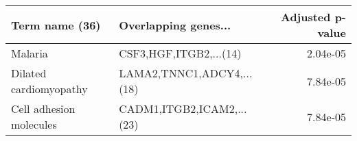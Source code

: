 \begin{tabular}{llr}
\toprule
         Term name (36) &      Overlapping genes... &  Adjusted p-value \\
\midrule
                Malaria &    CSF3,HGF,ITGB2,...(14) &          2.04e-05 \\
 Dilated cardiomyopathy & LAMA2,TNNC1,ADCY4,...(18) &          7.84e-05 \\
Cell adhesion molecules & CADM1,ITGB2,ICAM2,...(23) &          7.84e-05 \\
\bottomrule
\end{tabular}
